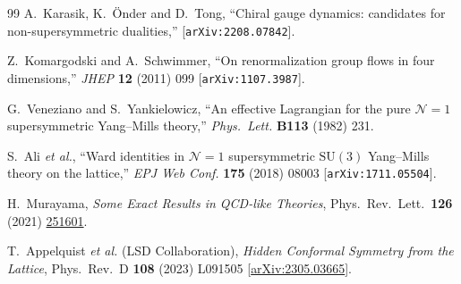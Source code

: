 \documentclass[11pt,a4paper]{article}
\theoremstyle{plain}
\theoremstyle{definition}
\theoremstyle{remark}
\newcommand{\SU}[1]{\mathrm{SU}(#1)}
\begin{document}
\begin{thebibliography}{99}
  A.~Karasik, K.~\"Onder and D.~Tong,
  ``Chiral gauge dynamics: candidates for non-supersymmetric dualities,''
  [\texttt{arXiv:2208.07842}].

  Z.~Komargodski and A.~Schwimmer, ``On renormalization group flows in
  four dimensions,'' \textit{JHEP} \textbf{12} (2011) 099
  [\texttt{arXiv:1107.3987}].

  G.~Veneziano and S.~Yankielowicz,
  ``An effective Lagrangian for the pure $\mathcal{N}=1$
  supersymmetric Yang--Mills theory,''
  \textit{Phys.~Lett.} \textbf{B113} (1982) 231.

  S.~Ali \textit{et al.}, ``Ward identities in $\mathcal N=1$
  supersymmetric $\SU{3}$ Yang--Mills theory on the lattice,''
  \textit{EPJ Web Conf.} \textbf{175} (2018) 08003
  [\texttt{arXiv:1711.05504}].

  H.~Murayama, \emph{Some Exact Results in QCD-like Theories},
  Phys.\ Rev.\ Lett.\ \textbf{126} (2021)
  \href{https://doi.org/10.1103/PhysRevLett.126.251601}{251601}.

  T.~Appelquist \textit{et al.} (LSD Collaboration),
  \emph{Hidden Conformal Symmetry from the Lattice},
  Phys.\ Rev.\ D \textbf{108} (2023) L091505
  [\href{https://arxiv.org/abs/2305.03665}{arXiv:2305.03665}].

\end{thebibliography}
\end{document}
